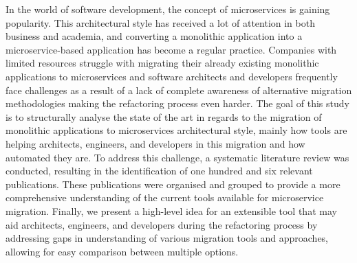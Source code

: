  In the world of software development, the concept of microservices is gaining
 popularity. This architectural style has received a lot of attention in both
 business and academia, and converting a monolithic application into a
 microservice-based application has become a regular practice. Companies with
 limited resources struggle with migrating their already existing monolithic
 applications to microservices and software architects and developers
 frequently face challenges as a result of a lack of complete awareness of
 alternative migration methodologies making the refactoring process even
 harder. The goal of this study is to structurally analyse the state of the
 art in regards to the migration of monolithic applications to microservices
 architectural style, mainly how tools are helping architects, engineers, and
 developers in this migration and how automated they are. To address this
 challenge, a systematic literature review was conducted, resulting in the
 identification of one hundred and six relevant publications. These
 publications were organised and grouped to provide a more comprehensive
 understanding of the current tools available for microservice migration.
 Finally, we present a high-level idea for an extensible tool that may aid
 architects, engineers, and developers during the refactoring process by
 addressing gaps in understanding of various migration tools and approaches,
 allowing for easy comparison between multiple options.
